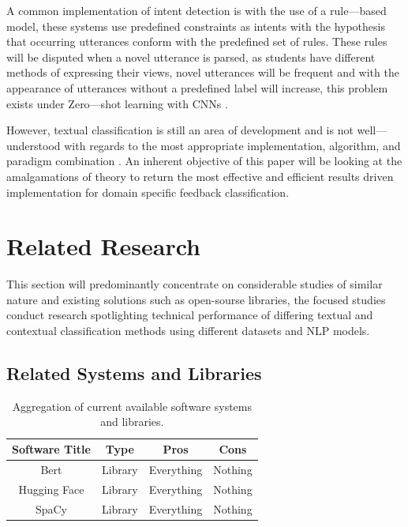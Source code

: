 A common implementation of intent detection is with the use of a rule---based model, these systems use predefined constraints as intents with the hypothesis that occurring utterances conform with the predefined set of rules. These rules will be disputed when a novel utterance is parsed, as students have different methods of expressing their views, novel utterances will be frequent and with the appearance of utterances without a predefined label will increase, this problem exists under Zero---shot learning with CNNs \parencite{xia2018zero}.

However, textual classification is still an area of development and is not well---understood with regards to the most appropriate implementation, algorithm, and paradigm combination \parencite{thangaraj2018text}. An inherent objective of this paper will be looking at the amalgamations of theory to return the most effective and efficient results driven implementation for domain specific feedback classification.

\section{Related Research}

This section will predominantly concentrate on considerable studies of similar nature and existing solutions such as open-sourse libraries, the focused studies conduct research spotlighting technical performance of differing textual and contextual classification methods using different datasets and NLP models.

\subsection{Related Systems and Libraries}

\begin{table}[H]
    \centering
    \begin{tabular}{|c c c c|}
        \hline
        Software Title & Type & Pros & Cons \\ [0.5ex]
        \hline
        Bert & Library & Everything & Nothing \\
        \hline
        Hugging Face & Library & Everything & Nothing \\
        \hline
        SpaCy & Library & Everything & Nothing \\ [1ex]
        \hline
    \end{tabular}
   \caption{Aggregation of current available software systems and libraries.}
   \label{tab:C2RelatedSystems}
\end{table}

